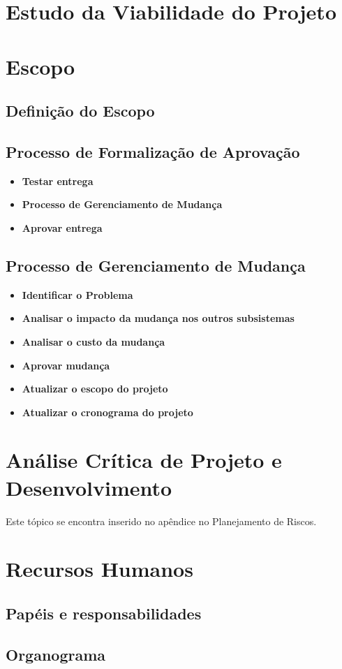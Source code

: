 \section{Estudo da Viabilidade do Projeto}

\section{Escopo}
\subsection{Definição do Escopo}

\subsection{Processo de Formalização de Aprovação}

\begin{itemize}
\item \textbf{Testar entrega}

\item \textbf{Processo de Gerenciamento de Mudança}

\item \textbf{Aprovar entrega} 
\end{itemize}

\subsection{Processo de Gerenciamento de Mudança}
 
\begin{itemize}

\item \textbf{Identificar o Problema}

\item \textbf{Analisar o impacto da mudança nos outros subsistemas}

\item \textbf{Analisar o custo da mudança}

\item\textbf{ Aprovar mudança}

\item \textbf{Atualizar o escopo do projeto}

\item \textbf{Atualizar o cronograma do projeto}

\end{itemize}

\section{Análise Crítica de Projeto e Desenvolvimento}
Este tópico se encontra inserido no apêndice no Planejamento de Riscos.


\section{Recursos Humanos}
\subsection{Papéis e responsabilidades}

\subsection{Organograma}    

    
    

